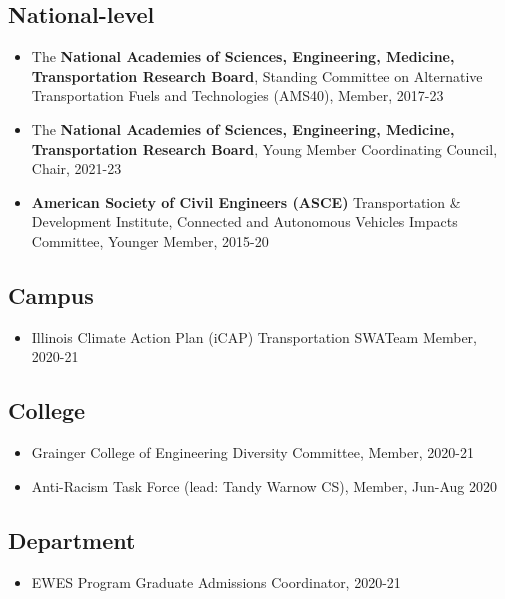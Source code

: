 \documentclass[margin,line]{resume}
\begin{document}
\begin{resume}
\subsection{\mysidestyle \bf National-level}
\begin{itemize}
	\item The {\bf National Academies of Sciences, Engineering, Medicine, Transportation Research Board}, Standing Committee on Alternative Transportation Fuels and Technologies (AMS40), Member, 2017-23
	
\item The {\bf National Academies of Sciences, Engineering, Medicine, Transportation Research Board}, Young Member Coordinating Council, Chair, 2021-23

\item {\bf American Society of Civil Engineers (ASCE)} Transportation & Development Institute, Connected and Autonomous Vehicles Impacts Committee, Younger Member, 2015-20
	\end{itemize}
	  \vspace{-25pt}
	\subsection{\mysidestyle \bf Campus}
\begin{itemize}
\item Illinois Climate Action Plan (iCAP) Transportation SWATeam Member, 2020-21
	\end{itemize}
		  \vspace{-25pt}
\subsection{\mysidestyle \bf College}
\begin{itemize}
\item Grainger College of Engineering Diversity Committee, Member, 2020-21
\item Anti-Racism Task Force (lead: Tandy Warnow CS), Member, Jun-Aug 2020
	\end{itemize}
		  \vspace{-25pt}
\subsection{\mysidestyle \bf Department}
\begin{itemize}
\item EWES Program Graduate Admissions Coordinator, 2020-21
\begin{itemize}
	\end{itemize}


\end{itemize}
\end{resume}
\end{document}

